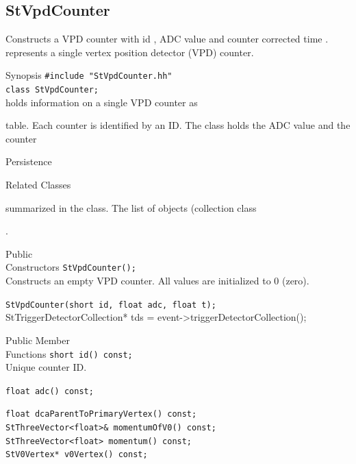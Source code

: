 \begin{Entry}
\begin{Entry}
{\subsection{StVpdCounter}
   
\label{sec:StVpdCounter}
    Constructs a VPD counter with id , ADC value 
    and counter corrected time .
     represents a single
    vertex position detector (VPD) counter.

\item[Synopsis]
    \verb+#include "StVpdCounter.hh"+\\
    \verb+class StVpdCounter;+\\

    
     holds information on a single VPD counter as
    
     table. Each counter
    is identified by an ID. The class holds the ADC value and the counter
    

\item[Persistence]
    

\item[Related Classes]
    
    summarized in the  class.  The list of
     objects (collection class
    
    .  
     

\item[Public\\ Constructors]
    \verb+StVpdCounter();+ \\
    Constructs an empty VPD counter. All values are initialized to 0 (zero).

    \verb+StVpdCounter(short id, float adc, float t);+ \\
    StTriggerDetectorCollection* tds = event->triggerDetectorCollection();

\item[Public Member\\ Functions]
    \verb+short id() const;+ \\
    Unique counter ID.

    \verb+float adc() const;+ \\
}%
    \verb+float dcaParentToPrimaryVertex() const;+\\
    \verb+StThreeVector<float>& momentumOfV0() const;+\\
    \verb+StThreeVector<float> momentum() const;+\\
    \verb+StV0Vertex* v0Vertex() const;+\\


\end{Entry}
\end{Entry}
